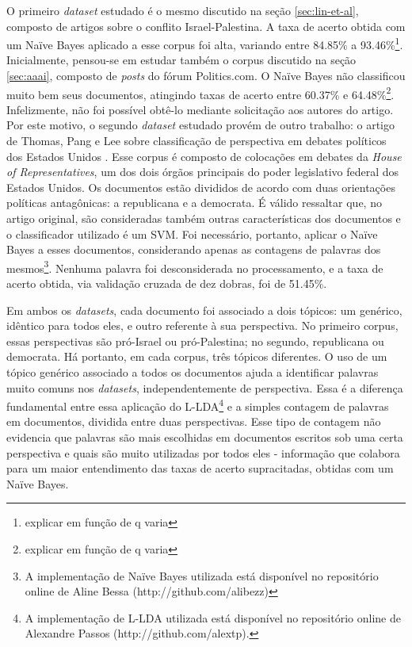 
O primeiro \emph{dataset} estudado é o mesmo discutido na seção \ref{sec:lin-et-al}, composto de artigos sobre o conflito Israel-Palestina. A taxa de acerto obtida com um Naïve Bayes aplicado a esse corpus foi alta, variando entre 84.85\% a 93.46\%\footnote{explicar em função de q varia}. Inicialmente, pensou-se em estudar também o corpus discutido na seção \ref{sec:aaai}, composto de \emph{posts} do fórum Politics.com. O Naïve Bayes não classificou muito bem seus documentos,  atingindo taxas de acerto entre 60.37\% e 64.48\%\footnote{explicar em função de q varia}. Infelizmente, não foi possível obtê-lo mediante solicitação aos autores do artigo. Por este motivo, o segundo \emph{dataset} estudado provém de outro trabalho: o artigo de Thomas, Pang e Lee sobre classificação de perspectiva em debates políticos dos Estados Unidos \cite{get-out-the-vote}. Esse corpus é composto de colocações em debates da \emph{House of Representatives}, um dos dois órgãos principais do poder legislativo federal dos Estados Unidos. Os documentos estão divididos de acordo com duas orientações políticas antagônicas: a republicana e a democrata.  É válido ressaltar que, no artigo original, são consideradas também outras características dos documentos e o classificador utilizado é um SVM. Foi necessário, portanto, aplicar o Naïve Bayes a esses documentos, considerando apenas as contagens de palavras dos mesmos\footnote{A implementação de Naïve Bayes utilizada está disponível no repositório online de Aline Bessa (http://github.com/alibezz)}. Nenhuma palavra foi desconsiderada no processamento, e a taxa de acerto obtida, via validação cruzada de dez dobras, foi de 51.45\%.  


Em ambos os \emph{datasets}, cada documento foi associado a dois tópicos: um genérico, idêntico para todos eles, e outro referente à sua perspectiva. No primeiro corpus, essas perspectivas são pró-Israel ou pró-Palestina; no segundo, republicana ou democrata. Há portanto, em cada corpus, três tópicos diferentes. O uso de um tópico genérico associado a todos os documentos ajuda a identificar palavras muito comuns nos \emph{datasets}, independentemente de perspectiva. Essa é a diferença fundamental entre essa aplicação do L-LDA\footnote{A implementação de L-LDA utilizada está disponível no repositório online de Alexandre Passos (http://github.com/alextp).} e a simples contagem de palavras em documentos, dividida entre duas perspectivas. Esse tipo de contagem não evidencia que palavras são mais escolhidas em documentos escritos sob uma certa perspectiva e quais são muito utilizadas por todos eles - informação que colabora para um maior entendimento das taxas de acerto supracitadas, obtidas com um Naïve Bayes. 

